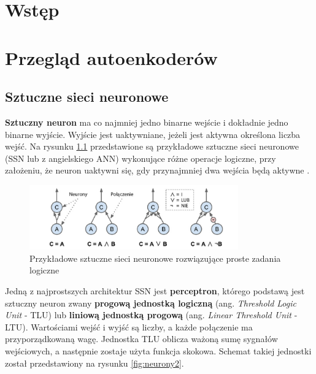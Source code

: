\documentclass[12pt]{mwbk}
\theoremstyle{plain}
\theoremstyle{definition}
\theoremstyle{remark}
\newcommand\zrodlo[1]{\par\vspace{-3mm}{\small\textit{Źródło: }#1 }}
\begin{document}



\tableofcontents


\chapter*{Wstęp}



\chapter{Przegląd autoenkoderów}

\section{Sztuczne sieci neuronowe}

\textbf{Sztuczny neuron} ma co najmniej jedno binarne wejście i dokładnie jedno binarne wyjście. Wyjście jest uaktywniane, jeżeli jest aktywna określona liczba wejść. Na rysunku \ref{fig:neurony1} przedstawione są przykładowe sztuczne sieci neuronowe (SSN lub z angielskiego ANN) wykonujące różne operacje logiczne, przy założeniu, że neuron uaktywni się, gdy przynajmniej dwa wejścia będą aktywne \cite{geron}.

\begin{figure}[!h]
	\centering
	\includegraphics[width=9cm]{rys/neurony1.png}
	\caption{Przykładowe sztuczne sieci neuronowe rozwiązujące proste zadania logiczne}
	\zrodlo{\cite{geron}}
	\label{fig:neurony1}
\end{figure}

Jedną z najprostszych architektur SSN jest \textbf{perceptron}, którego podstawą jest sztuczny neuron zwany \textbf{progową jednostką logiczną} (ang. \textit{Threshold Logic Unit} - TLU) lub \textbf{liniową jednostką progową} (ang. \textit{Linear Threshold Unit} - LTU). Wartościami wejść i wyjść są liczby, a każde połączenie ma przyporządkowaną wagę. Jednostka TLU oblicza ważoną sumę sygnałów wejściowych, a następnie zostaje użyta funkcja skokowa. Schemat takiej jednostki został przedstawiony na rysunku \ref{fig:neurony2}.
\end{document}
